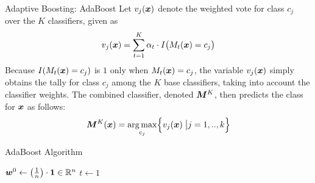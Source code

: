 {\begin{frame}{Adaptive Boosting: AdaBoost}
\medskip
Let $v_{j}({\boldsymbol x})$ denote the
weighted vote for class $c_{j}$ over the $K$ classif\/{i}ers, given as
\begin{align*}
  v_{j}({\boldsymbol x}) = \sum_{t=1}^K \alpha_t \cdot I\bigl(M_t({\boldsymbol x})= c_{j}\bigr)
\end{align*}
Because $I(M_t({\boldsymbol x}) = c_{j})$ is $1$ only when $M_t({\boldsymbol x}) = c_{j}$, the
variable $v_{j}({\boldsymbol x})$ simply obtains the tally for class $c_{j}$ among
the $K$ base classif\/{i}ers, taking into account the classif\/{i}er
weights. The combined classif\/{i}er, denoted ${\boldsymbol M}^K$, then predicts
the class for ${\boldsymbol x}$ as follows:
\begin{align*}
  {\boldsymbol M}^K({\boldsymbol x}) = \mathop{\arg\max}_{c_{j}} \Bigl\{ v_{j}({\boldsymbol x}) \;\bigl| j=1,..,k \Bigr\}
\end{align*}
\end{frame}




\newcommand{\algAdaBoost}{\textsc{AdaBoost}}
\begin{frame}[fragile]{AdaBoost Algorithm}
\begin{small}
\begin{tightalgo}[H]{\textwidth-18pt}
\SetKwInOut{Algorithm}{\algAdaBoost ($K$, $\bD$)}
\Algorithm{}
${\boldsymbol w}^0 \gets  \left(\frac{1}{n}\right)\cdot \mathbf{1} \in {\mathord{\mathbb R}}^n$\;
$t \gets 1$\;
\end{tightalgo}
\end{small}
\end{frame}



}

